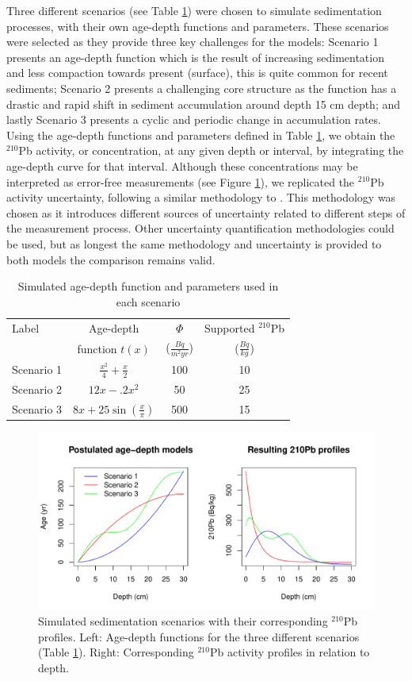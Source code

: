 \documentclass [10pt] {article}
\begin{document}
Three different scenarios (see Table \ref{tab:sim_param}) were chosen to simulate sedimentation processes, with their own age-depth functions and parameters. 
These scenarios were selected as they provide three key challenges for the models: Scenario 1 presents an age-depth function which is the result of increasing sedimentation and less compaction towards present (surface), this is quite common for recent sediments; Scenario 2 presents a challenging core structure as the function has a drastic and rapid shift in sediment accumulation around depth 15 cm depth; and lastly Scenario 3 presents a cyclic and periodic change in accumulation rates. 
Using the age-depth functions and parameters defined in Table \ref{tab:sim_param}, we obtain the $^{210}$Pb activity, or concentration, at any given depth or interval, by integrating the age-depth curve for that interval.  
Although these concentrations may be interpreted as error-free measurements 
(see Figure \ref{fig:true_210}), we replicated the $^{210}$Pb activity uncertainty, following a similar methodology to \citet{Blaauw2018}.
This methodology was chosen as it introduces different sources of uncertainty related to different steps of the measurement process.
Other uncertainty quantification methodologies could be used, but as longest the same methodology and uncertainty is provided to both models the comparison remains valid.
\begin{table}[!h]
	\centering
	\begin{tabular}{l|ccc}
Label    	& 	Age-depth		&	$ \Phi$		& Supported $^{210}$Pb  \\
		&	function $t(x)$		&	($\frac{Bq}{m^2yr }$)	& ($\frac{Bq}{kg}$) 	\\ \hline
Scenario 1 	&	$\frac{x^2}{4} + \frac{x}{2}$	&	100	& 10	\\
Scenario 2 	&	$12x -.2x^2$			&	50	& 25	\\
Scenario 3 	&	$8x+25\sin(\frac{x}{\pi})$	&	500 	& 15		
	\end{tabular}
	\label{tab:sim_param}
	\caption{Simulated age-depth function and parameters used in each scenario}
 \end{table}

\begin{figure}[!h]
 \centering
  \includegraphics[width=.95\linewidth]{chronology.pdf}
	\caption{Simulated sedimentation scenarios with their corresponding $^{210}$Pb profiles. Left: Age-depth functions for the three different scenarios (Table \ref{tab:sim_param}). Right: Corresponding $^{210}$Pb activity profiles in relation to depth.}
  \label{fig:true_210}
\end{figure}
\end{document}
